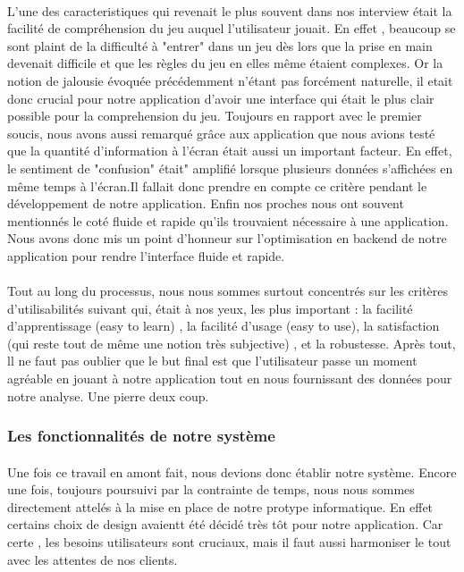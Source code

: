 \documentclass[../main.tex]{subfiles}
\begin{document}
\paragraph{}
L'une des caracteristiques qui revenait le plus souvent dans nos interview était la facilité de compréhension du jeu auquel l'utilisateur jouait. En effet , beaucoup se sont plaint de la difficulté à "entrer" dans un jeu dès lors que la prise en main devenait difficile et que les règles du jeu en elles même étaient complexes. Or la notion de jalousie évoquée précédemment n'étant pas forcément naturelle, il etait donc crucial pour notre application d'avoir une interface qui était le plus clair possible pour la comprehension du jeu. Toujours en rapport avec le premier soucis, nous avons aussi remarqué grâce aux application que nous avions testé que la quantité d'information à l'écran était aussi un important facteur. En effet, le sentiment de "confusion" était" amplifié lorsque plusieurs données s'affichées en même temps à l'écran.Il fallait donc prendre en compte ce critère pendant le développement de notre application. Enfin nos proches nous ont souvent mentionnés le coté fluide et rapide qu'ils trouvaient nécessaire à une application. Nous avons donc mis un point d'honneur sur l'optimisation en backend de notre application pour rendre l'interface fluide et rapide.
\paragraph{}
Tout au long du processus, nous nous sommes surtout concentrés sur les critères d'utilisabilités suivant qui, était à nos yeux, les plus important : la facilité d'apprentissage (easy to learn) , la facilité d'usage (easy to use), la satisfaction (qui reste tout de même une notion très subjective) , et la robustesse.
Après tout, ll ne faut pas oublier que le but final est que l'utilisateur passe un moment agréable en jouant à notre application tout en nous fournissant des données pour notre analyse. Une pierre deux coup.

	\subsubsection{Les fonctionnalités de notre système}

\paragraph{}
Une fois ce travail en amont fait, nous devions donc établir notre système. Encore une fois, toujours poursuivi par la contrainte de temps, nous nous sommes directement attelés à la mise en place de notre protype informatique. En effet certains choix de design avaientt été décidé très tôt pour notre application. Car certe , les besoins utilisateurs sont cruciaux, mais il faut aussi harmoniser le tout avec les attentes de nos clients. 
\end{document}
